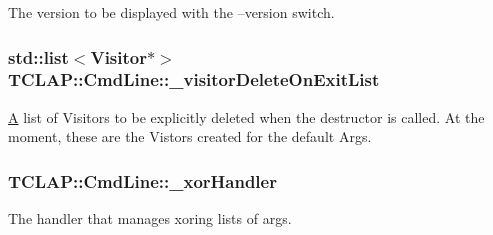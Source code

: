 The version to be displayed with the --version switch. \hypertarget{class_t_c_l_a_p_1_1_cmd_line_a79b8a947f8100de977574b45b91117ac}{
\subsubsection[{\+\_\+visitor\+Delete\+On\+Exit\+List}]{\setlength{\rightskip}{0pt plus 5cm}std\+::list$<${\bf Visitor}$\ast$$>$ T\+C\+L\+A\+P\+::\+Cmd\+Line\+::\+\_\+visitor\+Delete\+On\+Exit\+List\hspace{0.3cm}{\ttfamily [protected]}}}\label{class_t_c_l_a_p_1_1_cmd_line_a79b8a947f8100de977574b45b91117ac}
\hyperlink{class_a}{A} list of Visitors to be explicitly deleted when the destructor is called. At the moment, these are the Vistors created for the default Args. \hypertarget{class_t_c_l_a_p_1_1_cmd_line_a33846aa10c62ecd61640c93c16ac315d}{
\subsubsection[{\+\_\+xor\+Handler}]{ T\+C\+L\+A\+P\+::\+Cmd\+Line\+::\+\_\+xor\+Handler\hspace{0.3cm}{\ttfamily [protected]}}}\label{class_t_c_l_a_p_1_1_cmd_line_a33846aa10c62ecd61640c93c16ac315d}
The handler that manages xoring lists of args. 